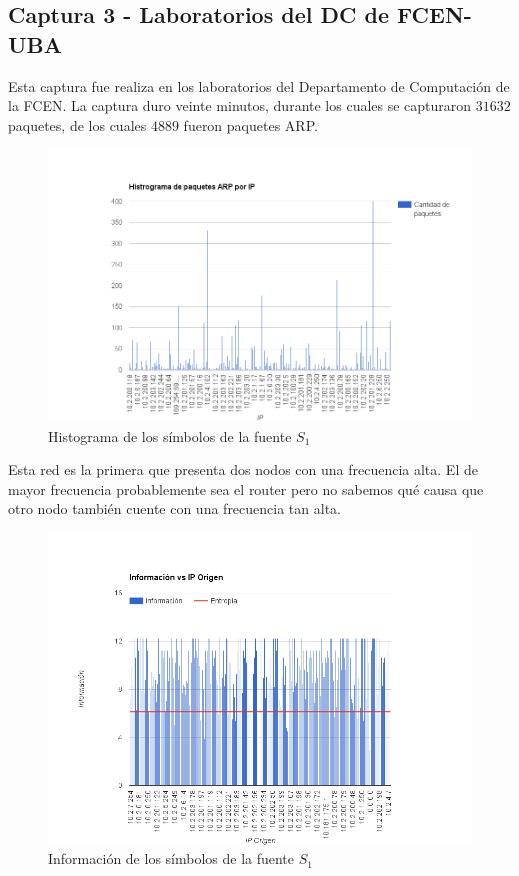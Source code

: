 \subsection{Captura 3 - Laboratorios del DC de FCEN-UBA}

Esta captura fue realiza en los laboratorios del Departamento de Computación de la FCEN. La captura duro veinte minutos, durante los cuales se capturaron $31632$ paquetes, de los cuales $4889$ fueron paquetes ARP.

\begin{figure}[H]
  \centering
    \includegraphics[width=1.1\textwidth]{imagenes/labosDC/histograma.png}
  \caption{Histograma de los símbolos de la fuente $S_1$}
  \label{fig:ejemplo}
\end{figure}

Esta red es la primera que presenta dos nodos con una frecuencia alta. El de mayor frecuencia probablemente sea el router pero no sabemos qué causa que otro nodo también cuente con una frecuencia tan alta.

\begin{figure}[H]
  \centering
    \includegraphics[width=1.1\textwidth]{imagenes/labosDC/ip_informacion.png}
  \caption{Información de los símbolos de la fuente $S_1$}
  \label{fig:ejemplo}
\end{figure}

